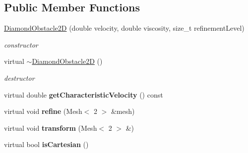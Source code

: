 \subsection*{Public Member Functions}
\begin{DoxyCompactItemize}
\item 
\hyperlink{classnatrium_1_1DiamondObstacle2D_a466c22e26de373b06ccba9c5e0a23c33}{DiamondObstacle2D} (double velocity, double viscosity, size\_\-t refinementLevel)
\begin{DoxyCompactList}\small\item\em constructor \item\end{DoxyCompactList}\item 
\hypertarget{classnatrium_1_1DiamondObstacle2D_a96119fe50e043dae093912884798d9a5}{
virtual \hyperlink{classnatrium_1_1DiamondObstacle2D_a96119fe50e043dae093912884798d9a5}{$\sim$DiamondObstacle2D} ()}
\label{classnatrium_1_1DiamondObstacle2D_a96119fe50e043dae093912884798d9a5}

\begin{DoxyCompactList}\small\item\em destructor \item\end{DoxyCompactList}\item 
\hypertarget{classnatrium_1_1DiamondObstacle2D_a9edc6d74879f7edd811b7180c1156a04}{
virtual double {\bfseries getCharacteristicVelocity} () const }
\label{classnatrium_1_1DiamondObstacle2D_a9edc6d74879f7edd811b7180c1156a04}

\item 
\hypertarget{classnatrium_1_1DiamondObstacle2D_a6fd173230aeb5e15db27d7f2a752df5a}{
virtual void {\bfseries refine} (Mesh$<$ 2 $>$ \&mesh)}
\label{classnatrium_1_1DiamondObstacle2D_a6fd173230aeb5e15db27d7f2a752df5a}

\item 
\hypertarget{classnatrium_1_1DiamondObstacle2D_a6a51680cf76b665f5eaedcf7d66acfec}{
virtual void {\bfseries transform} (Mesh$<$ 2 $>$ \&)}
\label{classnatrium_1_1DiamondObstacle2D_a6a51680cf76b665f5eaedcf7d66acfec}

\item 
\hypertarget{classnatrium_1_1DiamondObstacle2D_a323f8c082fd7b49547c72f1c416665f7}{
virtual bool {\bfseries isCartesian} ()}
\label{classnatrium_1_1DiamondObstacle2D_a323f8c082fd7b49547c72f1c416665f7}

\end{DoxyCompactItemize}


